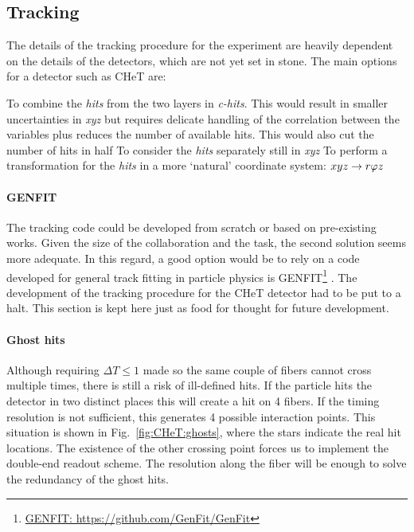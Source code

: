\begin{refsection}
    \subsection{Tracking}
    The details of the tracking procedure for the experiment are heavily dependent on the details of the detectors, which are not yet set in stone.
    The main options for a detector such as CHeT are:
    \begin{outline}
        \1 To combine the \textit{hits} from the two layers in \textit{c-hits}. This would result in smaller uncertainties in \textit{xyz} but requires delicate handling of the correlation between the variables plus reduces the number of available hits. This would also cut the number of hits in half
        \1 To consider the \textit{hits} separately still in \textit{xyz}
        \1 To perform a transformation for the \textit{hits} in a more `natural' coordinate system: $xyz\rightarrow r\varphi z$
    \end{outline}

        \paragraph{GENFIT}
        The tracking code could be developed from scratch or based on pre-existing works. 
        Given the size of the collaboration and the task, the second solution seems more adequate.
        In this regard, a good option would be to rely on a code developed for general track fitting in particle physics is GENFIT\footnote{\href{https://github.com/GenFit/GenFit}{GENFIT: https://github.com/GenFit/GenFit}} \cite{GENFIT}\cite{GENFIT:2}.
        The development of the tracking procedure for the CHeT detector had to be put to a halt. This section is kept here just as food for thought for future development.

        \paragraph{Ghost hits}
        Although requiring $\Delta T\leq1$ made so the same couple of fibers cannot cross multiple times, there is still a risk of ill-defined hits.
        If the particle hits the detector in two distinct places this will create a hit on 4 fibers. 
        If the timing resolution is not sufficient, this generates 4 possible interaction points.
        This situation is shown in Fig.~\ref{fig:CHeT:ghosts}, where the stars indicate the real hit locations.
        The existence of the other crossing point forces us to implement the double-end readout scheme.
        The resolution along the fiber will be enough to solve the redundancy of the ghost hits. 


\end{refsection}
